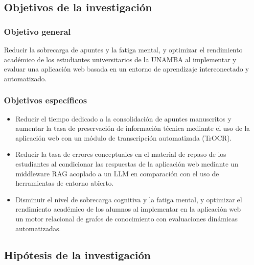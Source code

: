 
\subsection{Objetivos de la investigación}

\subsubsection{Objetivo general}
Reducir la sobrecarga de apuntes y la fatiga mental, y optimizar el rendimiento académico de los estudiantes universitarios de la UNAMBA al implementar y evaluar una aplicación web basada en un entorno de aprendizaje interconectado y automatizado.

\subsubsection{Objetivos específicos}
\begin{itemize}

\item 
Reducir el tiempo dedicado a la consolidación de apuntes manuscritos y aumentar la tasa de preservación de información técnica mediante el uso de la aplicación web con un módulo de transcripción automatizada (TrOCR).

\item
Reducir la tasa de errores conceptuales en el material de repaso de los estudiantes al condicionar las respuestas de la aplicación web mediante un middleware RAG acoplado a un LLM en comparación con el uso de herramientas de entorno abierto.

\item
Disminuir el nivel de sobrecarga cognitiva y la fatiga mental, y optimizar el rendimiento académico de los alumnos al implementar en la aplicación web un motor relacional de grafos de conocimiento con evaluaciones dinámicas automatizadas.

\end{itemize}
\subsection{Hipótesis de la investigación}

